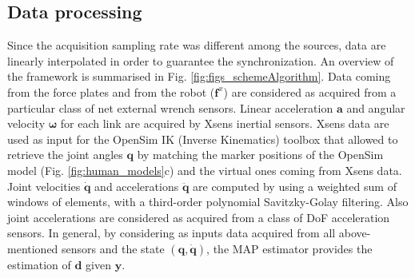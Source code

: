\subsection{Data processing}
Since the acquisition sampling rate was different among the sources, data are linearly
 interpolated in order to guarantee the synchronization. An overview of the framework is
  summarised in Fig. \ref{fig:figs_schemeAlgorithm}. Data coming from the force plates and from
   the robot (${\bm f^x}$) are considered as acquired from a particular class of net external
    wrench sensors. Linear acceleration $\bm a$ and angular velocity $\bm \omega$ for each
	 link are acquired by Xsens inertial sensors.
Xsens data are used as input for the OpenSim \cite{Delp2007} IK (Inverse Kinematics)
 toolbox that allowed to retrieve the joint angles $\bm q$ by matching 
 the marker positions of the OpenSim model (Fig. \ref{fig:human_models}c) and the virtual
 ones coming from Xsens data.
 Joint velocities $\bm {\dot q}$ and accelerations $\bm {\ddot q}$  are
    computed by using a weighted sum of windows of elements, with a third-order polynomial
	 Savitzky-Golay filtering. Also joint accelerations are considered as acquired from
	  a class of DoF acceleration sensors. In general, by considering as inputs data acquired
	   from all above-mentioned sensors and the state $(\bm q,\bm {\dot q})$, the MAP
	    estimator provides the estimation of $\bm d$ given $\bm y$.
%

